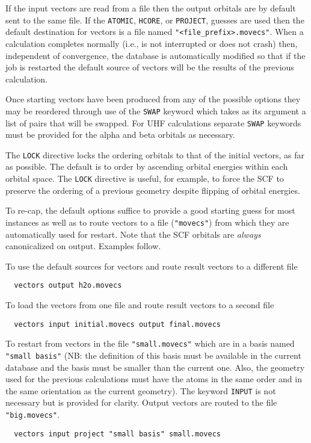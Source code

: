 If the input vectors are read from a file then the output orbitals are
by default sent to the same file.  If the \verb+ATOMIC+, \verb+HCORE+,
or \verb+PROJECT+, guesses are used then the default destination for
vectors is a file named \verb+"<file_prefix>.movecs"+.  When a
calculation completes normally (i.e., is not interrupted or does not
crash) then, independent of convergence, the database is automatically
modified so that if the job is restarted the default source of vectors
will be the results of the previous calculation.

Once starting vectors have been produced from any of the possible
options they may be reordered through use of the \verb+SWAP+ keyword
which takes as its argument a list of pairs that will be swapped.
For UHF calculations separate \verb+SWAP+ keywords must be provided
for the alpha and beta orbitals as necessary.

The \verb+LOCK+ directive locks the ordering orbitals to that of the
initial vectors, as far as possible. The default is to order by
ascending orbital energies within each orbital space. The \verb+LOCK+
directive is useful, for example, to force the SCF to preserve the
ordering of a previous geometry despite flipping of orbital energies.

To re-cap, the default options suffice to provide a good starting
guess for most instances as well as to route vectors to a file
(\verb+"movecs"+) from which they are automatically used for restart.
Note that the SCF orbitals are {\em always} canonicalized on output.
Examples follow.

To use the default sources for vectors and route result vectors
to a different file
\begin{verbatim}
  vectors output h2o.movecs
\end{verbatim}

To load the vectors from one file and route result vectors to a
second file
\begin{verbatim}
  vectors input initial.movecs output final.movecs
\end{verbatim}

To restart from vectors in the file \verb+"small.movecs"+ which are in
a basis named \verb+"small basis"+ (NB: the definition of this basis
must be available in the current database and the basis must be
smaller than the current one.  Also, the geometry used for the
previous calculations must have the atoms in the same order and in the
same orientation as the current geometry).  The keyword \verb+INPUT+
is not necessary but is provided for clarity.  Output vectors are
routed to the file \verb+"big.movecs"+.
\begin{verbatim}
  vectors input project "small basis" small.movecs
\end{verbatim}

